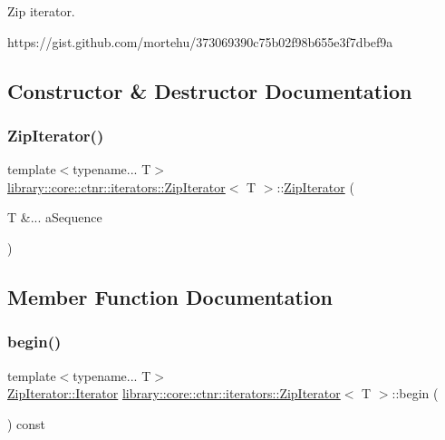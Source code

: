 Zip iterator. 

https\+://gist.github.\+com/mortehu/373069390c75b02f98b655e3f7dbef9a 

\subsection{Constructor \& Destructor Documentation}
\mbox{\label{classlibrary_1_1core_1_1ctnr_1_1iterators_1_1_zip_iterator_a3d8960d14f07cf22a2de2994eabe46aa}} 
\subsubsection{\texorpdfstring{Zip\+Iterator()}{ZipIterator()}}
{\footnotesize\ttfamily template$<$typename... T$>$ \\
\hyperlink{classlibrary_1_1core_1_1ctnr_1_1iterators_1_1_zip_iterator}{library\+::core\+::ctnr\+::iterators\+::\+Zip\+Iterator}$<$ T $>$\+::\hyperlink{classlibrary_1_1core_1_1ctnr_1_1iterators_1_1_zip_iterator}{Zip\+Iterator} (\begin{DoxyParamCaption}\item[{T \&...}]{a\+Sequence }\end{DoxyParamCaption})\hspace{0.3cm}{\ttfamily [inline]}}



\subsection{Member Function Documentation}
\mbox{\label{classlibrary_1_1core_1_1ctnr_1_1iterators_1_1_zip_iterator_a0467e25b565ac7b73b22a7002b87d189}} 
\subsubsection{\texorpdfstring{begin()}{begin()}}
{\footnotesize\ttfamily template$<$typename... T$>$ \\
\hyperlink{classlibrary_1_1core_1_1ctnr_1_1iterators_1_1_zip_iterator_1_1_iterator}{Zip\+Iterator\+::\+Iterator} \hyperlink{classlibrary_1_1core_1_1ctnr_1_1iterators_1_1_zip_iterator}{library\+::core\+::ctnr\+::iterators\+::\+Zip\+Iterator}$<$ T $>$\+::begin (\begin{DoxyParamCaption}{ }\end{DoxyParamCaption}) const\hspace{0.3cm}{\ttfamily [inline]}}

